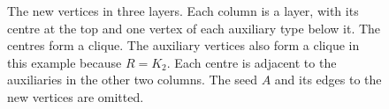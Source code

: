 \begin{figure}[htbp]
\centering
\caption{The new vertices in three layers. Each column is a layer,
with its centre at the top and one vertex of each auxiliary type
below it. The centres form a clique. The auxiliary vertices also
form a clique in this example because $R=K_2$. Each centre is
adjacent to the auxiliaries in the other two columns. The seed $A$
and its edges to the new vertices are omitted.}
\label{fig:layers}
\end{figure}
